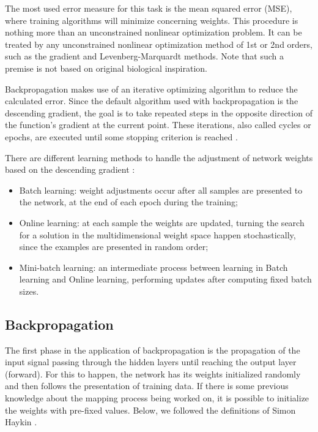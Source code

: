 \documentclass[ruled,graybox]{svmult}
\begin{document}
The most used error measure for this task is the mean squared error (MSE), %
where training algorithms will minimize concerning weights. This procedure is nothing more than an unconstrained nonlinear optimization problem. It can be treated %
by any unconstrained nonlinear optimization method of 1st or 2nd orders, such as the gradient and Levenberg-Marquardt methods. Note that such a premise is not based on original biological inspiration.

Backpropagation makes use of an iterative optimizing algorithm to reduce the calculated error. Since the default algorithm used with backpropagation is the descending gradient, the goal is to take repeated steps in the opposite direction of the function's gradient at the current point. These iterations, also called cycles or epochs, are executed until some stopping criterion is reached \cite{Castro2006FundamentalsON}.

There are different learning methods to handle the adjustment of network weights based on the descending gradient \cite{haykin, Bengio2012}:

\begin{itemize}
	\item Batch learning: weight adjustments occur after all samples are presented to the network, at the end of each epoch during the training;  %
	\item Online learning: at each sample the weights are updated, turning the search for a solution in the multidimensional weight space happen stochastically, since the examples are presented in random order;
	\item Mini-batch learning: an intermediate process between learning in Batch learning and Online learning, performing updates after computing fixed batch sizes.
\end{itemize}


\subsection{Backpropagation}
\label{ssec:Pseudocodigo}

The first phase in the application of backpropagation is the propagation of the input signal passing through the hidden layers until reaching the output layer (forward). For this to happen, the network has its weights initialized randomly and then follows the presentation of training data. If there is some previous knowledge about the mapping process being worked on, it is possible to initialize the weights with pre-fixed values. Below, we followed the definitions of Simon Haykin \cite{haykin}.
\end{document}
